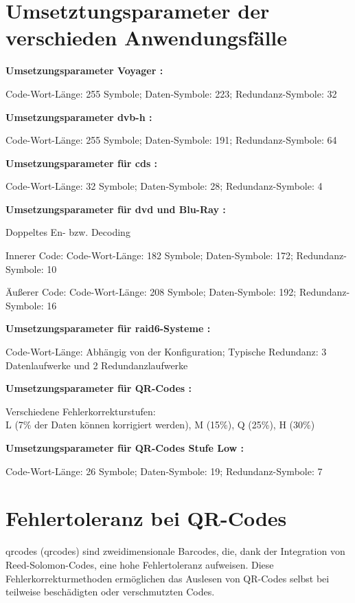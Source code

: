 \section{Umsetztungsparameter der verschieden Anwendungsfälle}\label{app:parameter}

\textbf{Umsetzungsparameter Voyager \cite[Kapitel 5]{ludwigVoyagerTelecommunications2002}:}

Code-Wort-Länge: 255 Symbole;
Daten-Symbole: 223;
Redundanz-Symbole: 32

\textbf{Umsetzungsparameter \acrshort{dvb-h} \cite{DVBH2024}:}

Code-Wort-Länge: 255 Symbole;
Daten-Symbole: 191;
Redundanz-Symbole: 64

\textbf{Umsetzungsparameter für \acrshort{cd}s \cite[Kapitel 4]{wickerReedSolomonCodes1994}:}
\nopagebreak

Code-Wort-Länge: 32 Symbole;
Daten-Symbole: 28;
Redundanz-Symbole: 4

\textbf{Umsetzungsparameter für \acrshort{dvd} und Blu-Ray \cite{changReedSolomonProductCodeRSPC1998}:}

Doppeltes En- bzw. Decoding

Innerer Code:
Code-Wort-Länge: 182 Symbole;
Daten-Symbole: 172;
Redundanz-Symbole: 10

Äußerer Code:
Code-Wort-Länge: 208 Symbole;
Daten-Symbole: 192;
Redundanz-Symbole: 16

\textbf{Umsetzungsparameter für \acrshort{raid}6-Systeme \cite{RAIDStorageTechnology2021}:}

Code-Wort-Länge: Abhängig von der Konfiguration;
Typische Redundanz: 3 Datenlaufwerke und 2 Redundanzlaufwerke

\textbf{Umsetzungsparameter für QR-Codes \cite{QRCode2024}:}

Verschiedene Fehlerkorrekturstufen: \\ L (7\% der Daten können korrigiert werden), M (15\%), Q (25\%), H (30\%)

\textbf{Umsetzungsparameter für QR-Codes Stufe Low \cite{QRCode2024}:}

Code-Wort-Länge: 26 Symbole;
Daten-Symbole: 19;
Redundanz-Symbole: 7

\section{Fehlertoleranz bei QR-Codes}\label{app:qr-code}

\acrlong{qrcode}s (\acrshort{qrcode}s) sind zweidimensionale Barcodes, die, dank der Integration von Reed-Solomon-Codes, eine hohe Fehlertoleranz aufweisen.
Diese Fehlerkorrekturmethoden ermöglichen das Auslesen von QR-Codes selbst bei teilweise beschädigten oder verschmutzten Codes. 

